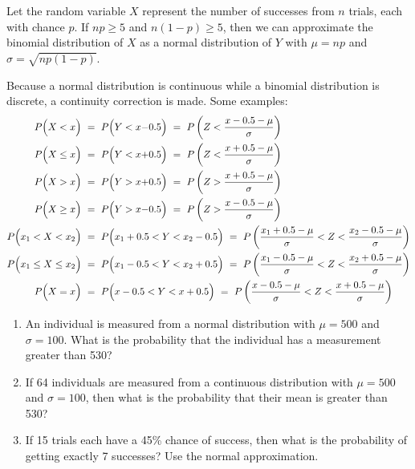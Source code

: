 \documentclass[12pt,letterpaper]{article}
\begin{document}
Let the random variable $X$ represent the number of successes from $n$ trials, each with chance $p$. If $np \ge 5$ and $n(1-p) \ge 5$, then we can approximate the binomial distribution of $X$ as a normal distribution of $Y$ with  $\mu= np$ and $\sigma = \sqrt{np(1-p)}$.

Because a normal distribution is continuous while a binomial distribution is discrete, a continuity correction is made. Some examples:
\begin{align*}
P\Bigl(X < x\Bigr) ~&=~ P\Bigl(Y < x{-}0.5\Bigr) ~=~ P\left(Z < \frac{x-0.5-\mu}{\sigma}\right)\\
P\Bigl(X \le x\Bigr) ~&=~ P\Bigl(Y < x{+}0.5\Bigr) ~=~ P\left(Z < \frac{x+0.5-\mu}{\sigma}\right) \\
P\Bigl(X > x\Bigr) ~&=~ P\Bigl(Y > x{+}0.5\Bigr) ~=~ P\left(Z > \frac{x+0.5-\mu}{\sigma}\right)\\
P\Bigl(X \ge x\Bigr) ~&=~ P\Bigl(Y > x{-}0.5\Bigr) ~=~ P\left(Z > \frac{x-0.5-\mu}{\sigma}\right) \\
P\Bigl(x_1 < X < x_2\Bigr) ~&=~ P\Bigl(x_1+0.5<Y < x_2-0.5\Bigr) ~=~ P\left(\frac{x_1+0.5-\mu}{\sigma}< Z < \frac{x_2-0.5-\mu}{\sigma}\right) \\
P\Bigl(x_1 \le X \le x_2\Bigr) ~&=~ P\Bigl(x_1-0.5 < Y < x_2+0.5\Bigr) ~=~ P\left(\frac{x_1-0.5-\mu}{\sigma}< Z < \frac{x_2+0.5-\mu}{\sigma}\right) \\
P\Bigl(X = x\Bigr) ~&=~ P\Bigl(x-0.5 < Y < x+0.5\Bigr) ~=~ P\left(\frac{x-0.5-\mu}{\sigma}< Z < \frac{x+0.5-\mu}{\sigma}\right) \\
\end{align*}

\newpage
\begin{enumerate}[resume]
\item An individual is measured from a normal distribution with $\mu = 500$ and $\sigma=100$. What is the probability that the individual has a measurement greater than 530?
\vfill
\item If 64 individuals are measured from a continuous distribution with $\mu = 500$ and $\sigma=100$, then what is the probability that their mean is greater than 530?
\vfill
\item If 15 trials each have a 45\% chance of success, then what is the probability of getting exactly 7 successes? Use the normal approximation.
\vfill
\end{enumerate}
\end{document}
